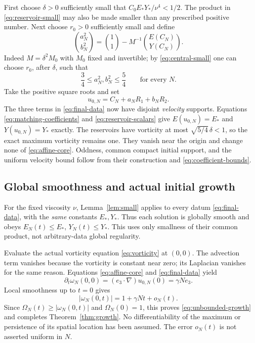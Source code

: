 \documentclass[11pt]{article}
\theoremstyle{remark}
\begin{document}
First choose $\delta>0$ sufficiently small that
$C_0E_*Y_*/\nu^4<1/2$. The product in
\eqref{eq:reservoir-small} may also be made smaller than any prescribed
positive number. Next choose $r_0>0$ sufficiently small and define
\begin{equation}
 \binom{a_N^2}{b_N^2}
   =\binom11-M^{-1}\binom{E(C_N)}{Y(C_N)}.
 \label{eq:matching-coefficients}
\end{equation}
Indeed $M=\delta^2 M_0$ with $M_0$ fixed and invertible; by
\eqref{eq:central-small} one can choose $r_0$, after $\delta$, such that
\begin{equation}
                 \frac34\le a_N^2,b_N^2\le\frac54
                 \qquad\text{for every }N.\label{eq:coefficient-bounds}
\end{equation}
Take the positive square roots and set
\begin{equation}
                   u_{0,N}=C_N+a_NR_1+b_NR_2.\label{eq:final-data}
\end{equation}
The three terms in \eqref{eq:final-data} now have disjoint
\emph{velocity} supports. Equations \eqref{eq:matching-coefficients} and
\eqref{eq:reservoir-scalars} give $E(u_{0,N})=E_*$ and
$Y(u_{0,N})=Y_*$ exactly. The reservoirs have vorticity at most
$\sqrt{5/4}\,\delta<1$, so the exact maximum vorticity remains one.
They vanish near the origin and change none of \eqref{eq:affine-core}.
Oddness, common compact initial support, and the uniform velocity bound
follow from their construction and \eqref{eq:coefficient-bounds}.

\subsection{Global smoothness and actual initial growth}
For the fixed viscosity $\nu$, Lemma~\ref{lem:small} applies to every datum
\eqref{eq:final-data}, with the \emph{same} constants $E_*,Y_*$. Thus each
solution is globally smooth and obeys $E_N(t)\le E_*$, $Y_N(t)\le Y_*$.
This uses only smallness of their common product, not arbitrary-data global
regularity.

Evaluate the actual vorticity equation \eqref{eq:vorticity} at $(0,0)$.
The advection term vanishes because the vorticity is constant near zero;
its Laplacian vanishes for the same reason. Equations
\eqref{eq:affine-core} and \eqref{eq:final-data} yield
\begin{equation}
 \partial_t\omega_N(0,0)
       =(e_3\cdot\nabla)u_{0,N}(0)=\gamma N e_3.
 \label{eq:actual-generator}
\end{equation}
Local smoothness up to $t=0$ gives
\begin{equation}
 |\omega_N(0,t)|=1+\gamma Nt+o_N(t).
\end{equation}
Since $\Omega_N(t)\ge|\omega_N(0,t)|$ and $\Omega_N(0)=1$, this proves
\eqref{eq:unbounded-growth} and completes Theorem~\ref{thm:growth}.
No differentiability of the maximum or persistence of its spatial location
has been assumed. The error $o_N(t)$ is not asserted uniform in $N$.
\end{document}
